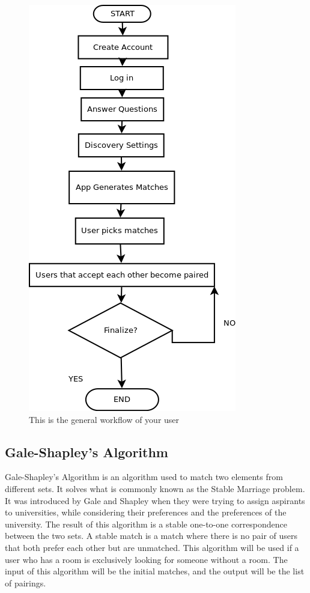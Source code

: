 \documentclass[journal]{./IEEE/IEEEtran}
\begin{document}
\begin{figure}[h]
\centering
\includegraphics[scale=0.5]{Workflow}
\caption{This is the general workflow of your user}
\end{figure}

\subsection{Gale-Shapley's Algorithm}
Gale-Shapley's Algorithm is an algorithm used to match two elements from different sets. It solves what is commonly known as the Stable Marriage problem. It was introduced by Gale and Shapley when they were trying to assign aspirants to universities, while considering their preferences and the preferences of the university. The result of this algorithm is a stable one-to-one correspondence between the two sets. A stable match is a match where there is no pair of users that both prefer each other but are unmatched. This algorithm will be used if a user who has a room is exclusively looking for someone without a room. The input of this algorithm will be the initial matches, and the output will be the list of pairings.
\end{document}
